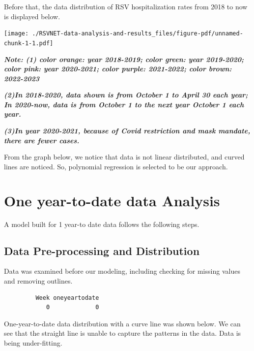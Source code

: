 \documentclass[
  letterpaper,
  DIV=11,
  numbers=noendperiod]{scrreport}
\begin{document}
Before that, the data distribution of RSV hospitalization rates from
2018 to now is displayed below.

\texttt{[image: ./RSVNET-data-analysis-and-results\_files/figure-pdf/unnamed-chunk-1-1.pdf]}

\textbf{\emph{Note: (1) color orange: year 2018-2019; color green: year
2019-2020; color pink: year 2020-2021; color purple: 2021-2022; color
brown: 2022-2023}}

\textbf{\emph{(2)In 2018-2020, data shown is from October 1 to April 30
each year; In 2020-now, data is from October 1 to the next year October
1 each year.}}

\textbf{\emph{(3)In year 2020-2021, because of Covid restriction and
mask mandate, there are fewer cases.}}

From the graph below, we notice that data is not linear distributed, and
curved lines are noticed. So, polynomial regression is selected to be
our approach.

\hypertarget{one-year-to-date-data-analysis}{%
\section{One year-to-date data
Analysis}\label{one-year-to-date-data-analysis}}

A model built for 1 year-to date data follows the following steps.

\hypertarget{data-pre-processing-and-distribution}{%
\subsection{Data Pre-processing and
Distribution}\label{data-pre-processing-and-distribution}}

Data was examined before our modeling, including checking for missing
values and removing outlines.

\begin{verbatim}
         Week oneyeartodate 
            0             0 
\end{verbatim}

One-year-to-date data distribution with a curve line was shown below. We
can see that the straight line is unable to capture the patterns in the
data. Data is being under-fitting.
\end{document}
